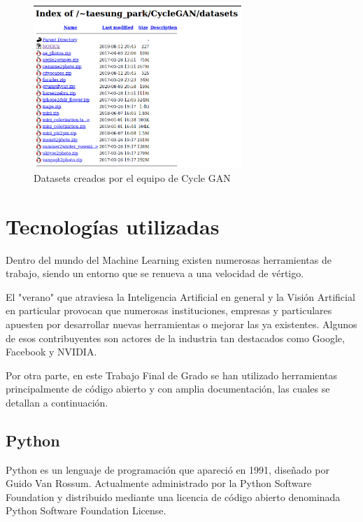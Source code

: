 \documentclass[../main.tex]{subfiles}
\begin{document}
\begin{figure}[h]
    \centering
    \includegraphics[width=0.7\textwidth]{imagenes/datasets_berkeley.png}
    \caption{Datasets creados por el equipo de Cycle GAN}
    \label{fig:datasets:berkeley}
\end{figure}

\section{Tecnologías utilizadas}
Dentro del mundo del Machine Learning existen numerosas herramientas de trabajo, siendo un entorno que se renueva a una velocidad de vértigo. \newline

El "verano" que atraviesa la Inteligencia Artificial en general y la Visión Artificial en particular provocan que numerosas instituciones, empresas y particulares apuesten por desarrollar nuevas herramientas o mejorar las ya existentes. Algunos de esos contribuyentes son actores de la industria tan destacados como Google, Facebook y NVIDIA.
\newline

Por otra parte, en este Trabajo Final de Grado se han utilizado herramientas principalmente de código abierto y con amplia documentación, las cuales se detallan a continuación.
\subsection{Python}
Python es un lenguaje de programación que apareció en 1991, diseñado por Guido Van Rossum. Actualmente administrado por la Python Software Foundation y distribuido mediante una licencia de código abierto denominada Python Software Foundation License. \newline
\end{document}
